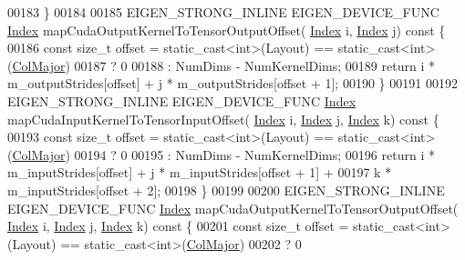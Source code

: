 \begin{DoxyCode}
00183   \}
00184 
00185   EIGEN\_STRONG\_INLINE EIGEN\_DEVICE\_FUNC \hyperlink{namespace_eigen_a62e77e0933482dafde8fe197d9a2cfde}{Index} mapCudaOutputKernelToTensorOutputOffset(
      \hyperlink{namespace_eigen_a62e77e0933482dafde8fe197d9a2cfde}{Index} i, \hyperlink{namespace_eigen_a62e77e0933482dafde8fe197d9a2cfde}{Index} j)\textcolor{keyword}{ const }\{
00186     \textcolor{keyword}{const} \textcolor{keywordtype}{size\_t} offset = \textcolor{keyword}{static\_cast<}\textcolor{keywordtype}{int}\textcolor{keyword}{>}(Layout) == static\_cast<int>(\hyperlink{group__enums_ggaacded1a18ae58b0f554751f6cdf9eb13a0cbd4bdd0abcfc0224c5fcb5e4f6669a}{ColMajor})
00187                               ? 0
00188                               : NumDims - NumKernelDims;
00189     \textcolor{keywordflow}{return} i * m\_outputStrides[offset] + j * m\_outputStrides[offset + 1];
00190   \}
00191 
00192   EIGEN\_STRONG\_INLINE EIGEN\_DEVICE\_FUNC \hyperlink{namespace_eigen_a62e77e0933482dafde8fe197d9a2cfde}{Index} mapCudaInputKernelToTensorInputOffset(
      \hyperlink{namespace_eigen_a62e77e0933482dafde8fe197d9a2cfde}{Index} i, \hyperlink{namespace_eigen_a62e77e0933482dafde8fe197d9a2cfde}{Index} j, \hyperlink{namespace_eigen_a62e77e0933482dafde8fe197d9a2cfde}{Index} k)\textcolor{keyword}{ const }\{
00193     \textcolor{keyword}{const} \textcolor{keywordtype}{size\_t} offset = \textcolor{keyword}{static\_cast<}\textcolor{keywordtype}{int}\textcolor{keyword}{>}(Layout) == static\_cast<int>(\hyperlink{group__enums_ggaacded1a18ae58b0f554751f6cdf9eb13a0cbd4bdd0abcfc0224c5fcb5e4f6669a}{ColMajor})
00194                               ? 0
00195                               : NumDims - NumKernelDims;
00196     \textcolor{keywordflow}{return} i * m\_inputStrides[offset] + j * m\_inputStrides[offset + 1] +
00197            k * m\_inputStrides[offset + 2];
00198   \}
00199 
00200   EIGEN\_STRONG\_INLINE EIGEN\_DEVICE\_FUNC \hyperlink{namespace_eigen_a62e77e0933482dafde8fe197d9a2cfde}{Index} mapCudaOutputKernelToTensorOutputOffset(
      \hyperlink{namespace_eigen_a62e77e0933482dafde8fe197d9a2cfde}{Index} i, \hyperlink{namespace_eigen_a62e77e0933482dafde8fe197d9a2cfde}{Index} j, \hyperlink{namespace_eigen_a62e77e0933482dafde8fe197d9a2cfde}{Index} k)\textcolor{keyword}{ const }\{
00201     \textcolor{keyword}{const} \textcolor{keywordtype}{size\_t} offset = \textcolor{keyword}{static\_cast<}\textcolor{keywordtype}{int}\textcolor{keyword}{>}(Layout) == static\_cast<int>(\hyperlink{group__enums_ggaacded1a18ae58b0f554751f6cdf9eb13a0cbd4bdd0abcfc0224c5fcb5e4f6669a}{ColMajor})
00202                               ? 0

\end{DoxyCode}
